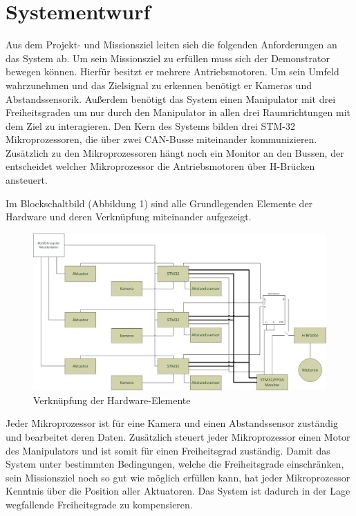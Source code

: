 \section{Systementwurf}
\label{Systementwurf}
Aus dem Projekt- und Missionsziel leiten sich die folgenden Anforderungen an das System ab.
Um sein Missionsziel zu erfüllen muss sich der Demonstrator bewegen können. Hierfür besitzt er mehrere Antriebsmotoren. Um sein Umfeld wahrzunehmen und das Zielsignal zu erkennen benötigt er Kameras und Abstandssensorik. Außerdem benötigt das System einen Manipulator mit drei Freiheitsgraden um nur durch den Manipulator in allen drei Raumrichtungen mit dem Ziel zu interagieren.
Den Kern des Systems bilden drei STM-32 Mikroprozessoren, die über zwei CAN-Busse miteinander kommunizieren. Zusätzlich zu den Mikroprozessoren hängt noch ein Monitor an den Bussen, der entscheidet welcher Mikroprozessor die Antriebsmotoren über H-Brücken ansteuert.

Im  Blockschaltbild (Abbildung 1) sind alle Grundlegenden Elemente der Hardware und deren Verknüpfung miteinander aufgezeigt.
\begin{figure}[H]
\centering
\includegraphics[width=1\linewidth]{Bilder/FaTNet_blockdiagramm.jpg}
\caption{Verknüpfung der Hardware-Elemente} 
\end{figure}
Jeder Mikroprozessor ist für eine Kamera und einen Abstandssensor zuständig und bearbeitet deren Daten. Zusätzlich steuert jeder Mikroprozessor einen Motor des Manipulators und ist somit für einen Freiheitsgrad zuständig. Damit das System unter bestimmten Bedingungen, welche die Freiheitsgrade einschränken, sein Missionsziel noch so gut wie möglich erfüllen kann, hat jeder Mikroprozessor Kenntnis über die Position aller Aktuatoren. Das System ist dadurch in der Lage wegfallende Freiheitsgrade zu kompensieren.

